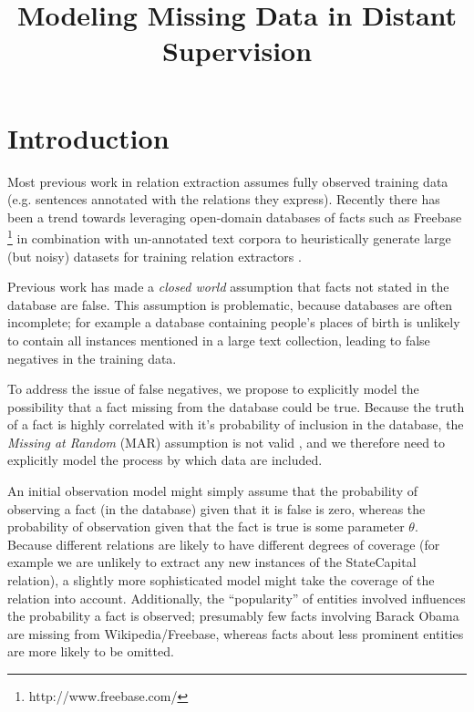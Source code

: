 \documentclass[12pt]{article}
\begin{document}
\date{}
\title{Modeling Missing Data in Distant Supervision}
\author{}
\maketitle



\section{Introduction}
Most previous work in relation extraction assumes fully observed training data (e.g. sentences annotated with the relations they express).
Recently there has been a trend towards leveraging open-domain databases of facts such as Freebase \footnote{http://www.freebase.com/} in combination with un-annotated text corpora to heuristically 
generate large (but noisy) datasets for training relation extractors \citep{mintz09,Hoffmann11}.

Previous work has made a \emph{closed world} assumption that facts not stated in the database are false.  
This assumption is problematic, because databases are often incomplete; for example a database 
containing people's places of birth is unlikely to contain all instances mentioned in a large text collection, leading to false negatives in
the training data.

To address the issue of false negatives, we propose to explicitly model the possibility that a fact missing from the database could
be true.  Because the truth of a fact is highly correlated with it's probability of inclusion in the database, the
\emph{Missing at Random} (MAR) assumption is not valid  \citep{Schafer02}, and we therefore need to explicitly model
the process by which data are included.

An initial observation model might simply assume that the probability of observing a fact (in the database) given that it is false is zero, whereas
the probability of observation given that the fact is true is some parameter $\theta$.  Because different relations are likely
to have different degrees of coverage (for example we are unlikely to extract any new instances of the {\sc StateCapital} relation),
a slightly more sophisticated model might take the coverage of the relation into account.  Additionally, the ``popularity'' of 
entities involved influences the probability a fact is observed; presumably few facts involving Barack Obama are missing from
Wikipedia/Freebase, whereas facts about less prominent entities are more likely to be omitted.
\end{document}
